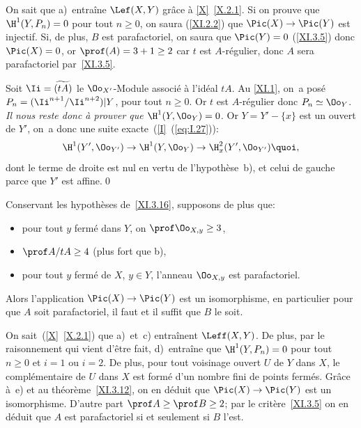 On sait que a)~entra\^ine $\Lef(X, Y)$ gr\^ace \`a \ref{X}~\ref{X.2.1}. Si on prouve que $\H^1(Y, P_n)=0$ pour tout $n\geq 0$, on saura \ignorespaces (\ref{XI.2.2}) que $\Pic(X)\to\Pic(Y)$ est injectif. Si, de plus, $B$ est parafactoriel, on saura que $\Pic(Y)=0$ (\ref{XI.3.5}) donc $\Pic(X)=0$, or $\prof(A)=3+1\geq 2$ car $t$ est $A$-r\'egulier, donc $A$ sera parafactoriel par~\ref{XI.3.5}.

Soit $\Ii=\widetilde{(tA)}$ le $\Oo_{X'}$-Module associ\'e \`a l'id\'eal $tA$. Au \numero \ref{XI.1}, on~a pos\'e $P_n = (\Ii^{n+1}/\Ii^{n+2}){|Y}$, pour tout $n\geq 0$. Or $t$ est $A$-r\'egulier donc $P_n\simeq \Oo_Y$. \emph{Il nous reste donc à prouver que $\H^1(Y, \Oo_Y)=0$.} Or $Y = Y'-\{x\}$ est un ouvert de $Y'$, on~a donc une suite exacte~(\ref{I}~(\ref{eq:I.27})):
\[
\H^1(Y', \Oo_{Y'})\to\H^1(Y, \Oo_{Y})\to\H^2_x(Y', \Oo_{Y'}){\quoi},
\]
dont le terme de droite est nul en vertu de l'hypoth\`ese~b), et celui de gauche parce que $Y'$ est affine.\qed

\begin{lemme} \label{XI.3.17}
Conservant les hypoth\`eses de~\ref{XI.3.16}, supposons de plus que:
\begin{itemize}
\item[c)] pour tout $y$ ferm\'e dans $Y$, on $\prof\Oo_{X, y}\geq 3$,
\item[d)] $\prof A/tA\geq 4$ (plus fort que b),
\item[e)] pour tout $y$ ferm\'e de $X$, $y\in Y$, l'anneau $\Oo_{X, y}$ est parafactoriel.
\end{itemize}
Alors l'application $\Pic(X)\to\Pic(Y)$ est un isomorphisme, en particulier pour que $A$ soit parafactoriel, il faut et il suffit que $B$ le soit.
\end{lemme}

\enlargethispage{5mm}%
On sait~(\ref{X}~\ref{X.2.1}) que a)~et~c) entra\^inent $\Leff(X, Y)$. De plus, par le raisonnement qui vient d'\^etre fait, d)~entra\^ine que $\H^1(Y, P_n)=0$ pour tout $n\geq 0$ et $i=1$ ou $i=2$. De plus, pour tout voisinage ouvert $U$ de $Y$ dans $X$, le compl\'ementaire de $U$ dans $X$ est form\'e d'un nombre fini de points ferm\'es. Gr\^ace \`a~e) et au th\'eor\`eme~\ref{XI.3.12}, on en d\'eduit que $\Pic(X)\to \Pic(Y)$ est un isomorphisme. D'autre part $\prof A\geq \prof B\geq 2$; par le crit\`ere~\ref{XI.3.5} on en d\'eduit que $A$ est parafactoriel si et seulement si $B$ l'est.

